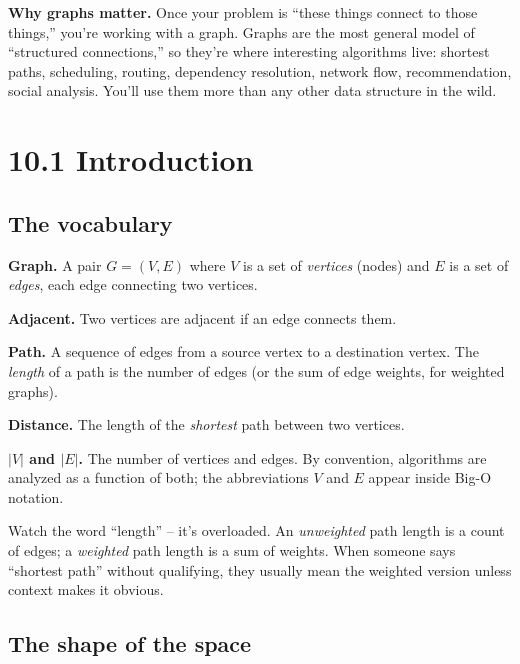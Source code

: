 \documentclass[11pt]{article}
\begin{document}
\begin{ideabox}
\textbf{Why graphs matter.} Once your problem is ``these things
connect to those things,'' you're working with a graph. Graphs are
the most general model of ``structured connections,'' so they're
where interesting algorithms live: shortest paths, scheduling,
routing, dependency resolution, network flow, recommendation,
social analysis. You'll use them more than any other data structure
in the wild.
\end{ideabox}

\section{10.1 Introduction}

\subsection*{The vocabulary}

\begin{defnbox}
\textbf{Graph.} A pair $G = (V, E)$ where $V$ is a set of \emph{vertices} (nodes) and $E$ is a set of \emph{edges}, each edge connecting two vertices.

\textbf{Adjacent.} Two vertices are adjacent if an edge connects them.

\textbf{Path.} A sequence of edges from a source vertex to a destination vertex. The \emph{length} of a path is the number of edges (or the sum of edge weights, for weighted graphs).

\textbf{Distance.} The length of the \emph{shortest} path between two vertices.

\textbf{$|V|$ and $|E|$.} The number of vertices and edges. By convention, algorithms are analyzed as a function of both; the abbreviations $V$ and $E$ appear inside Big-O notation.
\end{defnbox}

\begin{notebox}
Watch the word ``length'' -- it's overloaded. An \emph{unweighted} path length is a count of edges; a \emph{weighted} path length is a sum of weights. When someone says ``shortest path'' without qualifying, they usually mean the weighted version unless context makes it obvious.
\end{notebox}

\subsection*{The shape of the space}
\end{document}
